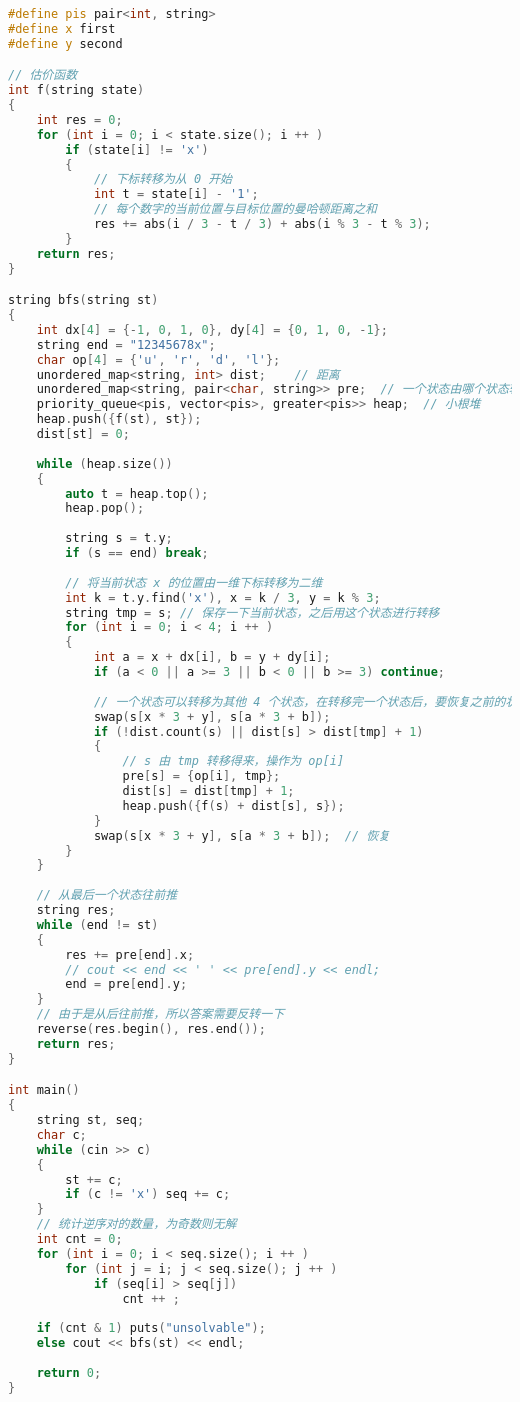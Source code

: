 \begin{lstlisting}[language=cpp]
#define pis pair<int, string>
#define x first
#define y second

// 估价函数
int f(string state)
{
    int res = 0;
    for (int i = 0; i < state.size(); i ++ )
        if (state[i] != 'x')
        {
            // 下标转移为从 0 开始
            int t = state[i] - '1';
            // 每个数字的当前位置与目标位置的曼哈顿距离之和
            res += abs(i / 3 - t / 3) + abs(i % 3 - t % 3);
        }
    return res;
}

string bfs(string st)
{
    int dx[4] = {-1, 0, 1, 0}, dy[4] = {0, 1, 0, -1};
    string end = "12345678x";
    char op[4] = {'u', 'r', 'd', 'l'};
    unordered_map<string, int> dist;    // 距离
    unordered_map<string, pair<char, string>> pre;  // 一个状态由哪个状态转移得来
    priority_queue<pis, vector<pis>, greater<pis>> heap;  // 小根堆
    heap.push({f(st), st});
    dist[st] = 0;
    
    while (heap.size())
    {
        auto t = heap.top();
        heap.pop();
        
        string s = t.y;
        if (s == end) break;
        
        // 将当前状态 x 的位置由一维下标转移为二维
        int k = t.y.find('x'), x = k / 3, y = k % 3;
        string tmp = s; // 保存一下当前状态，之后用这个状态进行转移
        for (int i = 0; i < 4; i ++ )
        {
            int a = x + dx[i], b = y + dy[i];
            if (a < 0 || a >= 3 || b < 0 || b >= 3) continue;
            
            // 一个状态可以转移为其他 4 个状态，在转移完一个状态后，要恢复之前的状态
            swap(s[x * 3 + y], s[a * 3 + b]);
            if (!dist.count(s) || dist[s] > dist[tmp] + 1)
            {
                // s 由 tmp 转移得来，操作为 op[i]
                pre[s] = {op[i], tmp};
                dist[s] = dist[tmp] + 1;
                heap.push({f(s) + dist[s], s});
            }
            swap(s[x * 3 + y], s[a * 3 + b]);  // 恢复
        }
    }
    
    // 从最后一个状态往前推
    string res;
    while (end != st)
    {
        res += pre[end].x;
        // cout << end << ' ' << pre[end].y << endl;
        end = pre[end].y;
    }
    // 由于是从后往前推，所以答案需要反转一下
    reverse(res.begin(), res.end());
    return res;
}

int main()
{
    string st, seq;
    char c;
    while (cin >> c)
    {
        st += c;
        if (c != 'x') seq += c;
    }
    // 统计逆序对的数量，为奇数则无解
    int cnt = 0;
    for (int i = 0; i < seq.size(); i ++ )
        for (int j = i; j < seq.size(); j ++ )
            if (seq[i] > seq[j])
                cnt ++ ;
    
    if (cnt & 1) puts("unsolvable");
    else cout << bfs(st) << endl;
    
    return 0;
}
\end{lstlisting}
